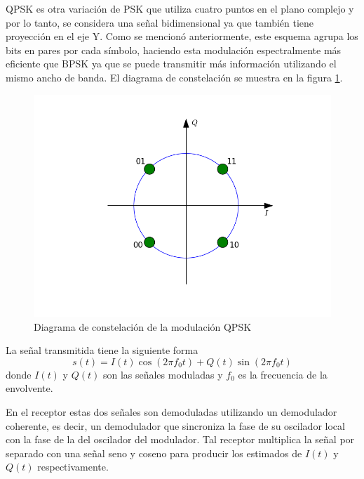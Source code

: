 QPSK es otra variaci\'on de PSK que utiliza cuatro puntos en el plano complejo y
por lo tanto, se considera una se\~nal bidimensional ya que tambi\'en tiene
proyecci\'on en el eje Y. Como se mencion\'o anteriormente, este esquema agrupa
los bits en pares por cada s\'imbolo, haciendo esta modulaci\'on espectralmente
m\'as eficiente que BPSK ya que se puede transmitir m\'as informaci\'on
utilizando el mismo ancho de banda. El diagrama de constelaci\'on se muestra en
la figura \ref{fig:qpskconst}.
\begin{figure}[hpt]
\centering
	\includegraphics[width=5.5in]{figs/qpsk}
	\caption{Diagrama de constelaci\'on de la modulaci\'on QPSK}
	\label{fig:qpskconst}
\end{figure}

La se\~nal transmitida tiene la siguiente forma \cite{sklar}
\begin{equation}\label{eq:transmit}
s(t)=I(t)\cos(2\pi f_0t)+Q(t)\sin(2\pi f_0t)
\end{equation}
donde $I(t)$ y $Q(t)$ son las se\~nales moduladas y $f_0$ es la frecuencia de la
envolvente.

En el receptor estas dos se\~nales son demoduladas utilizando un demodulador
coherente, es decir, un demodulador que sincroniza la fase de su oscilador
local con la fase de la del oscilador del modulador. Tal receptor multiplica la
se\~nal por separado con una se\~nal seno y coseno para producir los estimados
de $I(t)$ y $Q(t)$ respectivamente.

